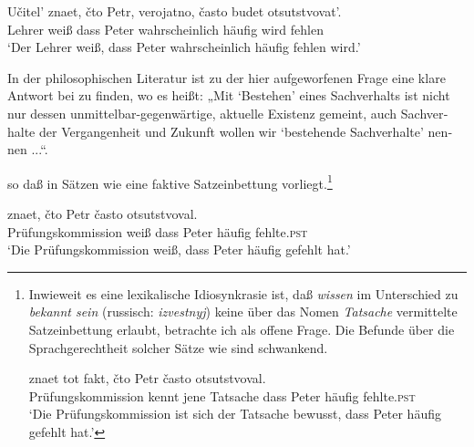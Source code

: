 \documentclass[output=paper]{langscibook}
\begin{document}
\begin{otherlanguage}{german}
{\ea \label{ex:zi83:f53iii}
    \gll Učitel' znaet, čto Petr, verojatno, často budet otsutstvovat’. \\
     Lehrer weiß dass Peter wahrscheinlich häufig wird fehlen \\
    \glt ‘Der Lehrer weiß, dass Peter wahrscheinlich häufig fehlen wird.’
\z

\noindent In der philosophischen Literatur ist zu der hier aufgeworfenen Frage eine klare Antwort bei \citet[39]{wagner1974zur-marxistisch-leninistischen-wahrheitstheorie} zu finden, wo es heißt: „Mit ‘Bestehen’ eines Sachverhalts ist nicht nur dessen unmittelbar-gegenwärtige, aktuelle Existenz gemeint, auch Sachverhalte der Vergangenheit und Zukunft wollen wir ‘bestehende Sachverhalte’ nennen ...“.} so daß in Sätzen wie  eine faktive Satzeinbettung vorliegt.\footnote{Inwieweit es eine lexikalische Idiosynkrasie ist, daß \textit{wissen} im Unterschied zu \textit{bekannt sein} (russisch: \textit{izvestnyj}) keine über das Nomen \textit{Tatsache} vermittelte Satzeinbettung erlaubt, betrachte ich als offene Frage. Die Befunde über die Sprachgerechtheit solcher Sätze wie  sind schwankend.

\ea \label{ex:zi83:f54i}
     znaet tot fakt, čto Petr často otsutstvoval. \\
    Prüfungskommission kennt jene Tatsache dass Peter häufig fehlte.\textsc{pst} \\
    \glt ‘Die Prüfungskommission ist sich der Tatsache bewusst, dass Peter häufig gefehlt hat.’
\z
}

\ea \label{ex:zi83:47}
     znaet, čto Petr často otsutstvoval. \\
    Prüfungskommission weiß dass Peter häufig fehlte.\textsc{pst} \\
    \glt ‘Die Prüfungskommission weiß, dass Peter häufig gefehlt hat.’
\z


\end{otherlanguage}
\end{document}
